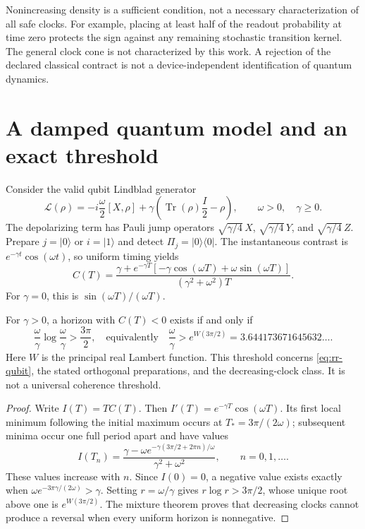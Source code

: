 Nonincreasing density is a sufficient condition, not a necessary
characterization of all safe clocks.  For example, placing at least half of the
readout probability at time zero protects the sign against any remaining
stochastic transition kernel.  The general clock cone is not characterized by
this work.  A rejection of the declared classical contract is not a
device-independent identification of quantum dynamics.

\section{A damped quantum model and an exact threshold}
\label{sec:rr-quantum}

Consider the valid qubit Lindblad generator
\begin{equation}
 \mathcal L(\rho)=-i\frac{\omega}{2}[X,\rho]
  +\gamma\left(\operatorname{Tr}(\rho)\frac I2-\rho\right),
 \qquad \omega>0,\quad\gamma\ge0.
 \label{eq:rr-qubit}
\end{equation}
The depolarizing term has Pauli jump operators
$\sqrt{\gamma/4}\,X$, $\sqrt{\gamma/4}\,Y$, and
$\sqrt{\gamma/4}\,Z$.
Prepare $j=|0\rangle$ or $i=|1\rangle$ and detect
$\Pi_j=|0\rangle\langle0|$.  The instantaneous contrast is
$e^{-\gamma t}\cos(\omega t)$, so uniform timing yields
\begin{equation}
 C(T)=\frac{\gamma+e^{-\gamma T}
       [-\gamma\cos(\omega T)+\omega\sin(\omega T)]}
       {(\gamma^2+\omega^2)T}.
 \label{eq:rr-qubit-contrast}
\end{equation}
For $\gamma=0$, this is $\sin(\omega T)/(\omega T)$.

\begin{theorem}
\label{thm:rr-threshold}
For $\gamma>0$, a horizon with $C(T)<0$ exists if and only if
\begin{equation}
 \frac{\omega}{\gamma}\log\frac{\omega}{\gamma}>\frac{3\pi}{2},
 \quad\text{equivalently}\quad
 \frac{\omega}{\gamma}>e^{W(3\pi/2)}
 =3.644173671645632\ldots .
 \label{eq:rr-threshold}
\end{equation}
Here $W$ is the principal real Lambert function.  This threshold concerns
\eqref{eq:rr-qubit}, the stated orthogonal preparations, and the decreasing-clock
class.  It is not a universal coherence threshold.
\end{theorem}

\begin{proof}
Write $I(T)=T C(T)$.  Then $I'(T)=e^{-\gamma T}\cos(\omega T)$.
Its first local minimum following the initial maximum occurs at
$T_*=3\pi/(2\omega)$; subsequent minima occur one full period apart and have
values
\[
 I(T_n)=\frac{\gamma-\omega
 e^{-\gamma(3\pi/2+2\pi n)/\omega}}{\gamma^2+\omega^2},
 \qquad n=0,1,\ldots .
\]
These values increase with $n$.  Since $I(0)=0$, a negative value exists exactly
when $\omega e^{-3\pi\gamma/(2\omega)}>\gamma$.
Setting $r=\omega/\gamma$ gives $r\log r>3\pi/2$, whose unique root above one
is $e^{W(3\pi/2)}$.  The mixture theorem proves that decreasing clocks cannot
produce a reversal when every uniform horizon is nonnegative.
\end{proof}


